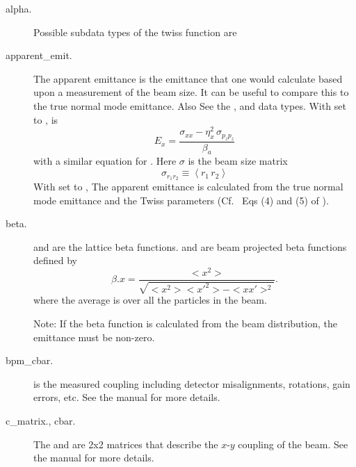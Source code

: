   \begin{description}

  \item[alpha.] \Newline
Possible subdata types of the twiss function  are 

  \item[apparent_emit.] \Newline
The apparent emittance is the emittance that one would calculate based
upon a measurement of the beam size\cite{b:emit}. It can be useful to
compare this to the true normal mode emittance. Also See the
,  and  data types.
With  set to ,  is
\begin{equation}
  E_x = \frac{\sigma_{xx} - \eta_x^2 \, \sigma_{p_zp_z}}{\beta_a}
\end{equation}
with a similar equation for . Here $\sigma$ is the beam size matrix
\begin{equation}
  \sigma_{r_1r_2} \equiv \left< r_1 \, r_2 \right>
\end{equation}
With  set to , The apparent emittance is
calculated from the true normal mode emittance and the Twiss
parameters (Cf.~ Eqs (4) and (5) of \cite{b:emit}).

  \item[beta.] \Newline
{} and  are the lattice beta functions.  and
 are beam projected beta functions defined by
\begin{equation}
  \beta.x = \frac{<x^{2}>}{\sqrt{<x^{2}> <x'^{2}> - <x x'>^{2}}}.
\end{equation}
where the average \vn{<>} is over all the particles in the beam.

Note: If the beta function is calculated from the beam distribution,
the emittance must be non-zero.

  \item[bpm_cbar.]
 is the measured coupling including detector misalignments, rotations, gain errors, etc.
See the \bmad manual for more details.

  \item[c_matrix., cbar.]
The  and  are 2x2 matrices that describe the $x$-$y$ coupling of the beam.
See the \bmad manual for more details.


\end{description}

